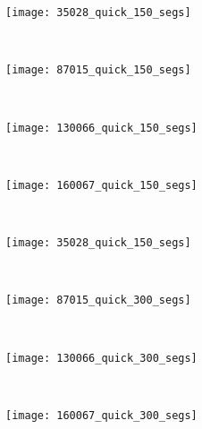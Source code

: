 \begin{figure}[!ht]
    \begin{subfigure}[t]{\textwidth+20pt\relax}
    	\texttt{[image: 35028\_quick\_150\_segs]} 
    \end{subfigure}      
    ~ %
    \begin{subfigure}[b]{0.2\textwidth}
        \texttt{[image: 87015\_quick\_150\_segs]}
    \end{subfigure}
    ~ %
    \begin{subfigure}[b]{0.2\textwidth}
        \texttt{[image: 130066\_quick\_150\_segs]}
    \end{subfigure}
    ~ %
    \begin{subfigure}[b]{0.2\textwidth}
        \texttt{[image: 160067\_quick\_150\_segs]}
    \end{subfigure} \\ [2ex]
    
    \begin{subfigure}[t]{\textwidth+20pt\relax}
    	\texttt{[image: 35028\_quick\_150\_segs]} 
    \end{subfigure}      
    ~ %
    \begin{subfigure}[b]{0.2\textwidth}
        \texttt{[image: 87015\_quick\_300\_segs]}
    \end{subfigure}
    ~ %
    \begin{subfigure}[b]{0.2\textwidth}
        \texttt{[image: 130066\_quick\_300\_segs]}
    \end{subfigure}
    ~ %
    \begin{subfigure}[b]{0.2\textwidth}
        \texttt{[image: 160067\_quick\_300\_segs]}
    \end{subfigure} \\ [2ex]
    

\end{figure}
